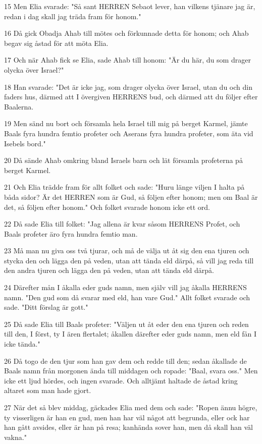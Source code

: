 \par 15 Men Elia svarade: "Så sant HERREN Sebaot lever, han vilkens tjänare jag är, redan i dag skall jag träda fram för honom."
\par 16 Då gick Obadja Ahab till mötes och förkunnade detta för honom; och Ahab begav sig åstad för att möta Elia.
\par 17 Och när Ahab fick se Elia, sade Ahab till honom: "Är du här, du som drager olycka över Israel?"
\par 18 Han svarade: "Det är icke jag, som drager olycka över Israel, utan du och din faders hus, därmed att I övergiven HERRENS bud, och därmed att du följer efter Baalerna.
\par 19 Men sänd nu bort och församla hela Israel till mig på berget Karmel, jämte Baals fyra hundra femtio profeter och Aserans fyra hundra profeter, som äta vid Isebels bord."
\par 20 Då sände Ahab omkring bland Israels barn och lät församla profeterna på berget Karmel.
\par 21 Och Elia trädde fram för allt folket och sade: "Huru länge viljen I halta på båda sidor? Är det HERREN som är Gud, så följen efter honom; men om Baal är det, så följen efter honom." Och folket svarade honom icke ett ord.
\par 22 Då sade Elia till folket: "Jag allena är kvar såsom HERRENS Profet, och Baals profeter äro fyra hundra femtio man.
\par 23 Må man nu giva oss två tjurar, och må de välja ut åt sig den ena tjuren och stycka den och lägga den på veden, utan att tända eld därpå, så vill jag reda till den andra tjuren och lägga den på veden, utan att tända eld därpå.
\par 24 Därefter mån I åkalla eder guds namn, men själv vill jag åkalla HERRENS namn. "Den gud som då svarar med eld, han vare Gud." Allt folket svarade och sade. "Ditt förslag är gott."
\par 25 Då sade Elia till Baals profeter: "Väljen ut åt eder den ena tjuren och reden till den, I först, ty I ären flertalet; åkallen därefter eder guds namn, men eld fån I icke tända."
\par 26 Då togo de den tjur som han gav dem och redde till den; sedan åkallade de Baals namn från morgonen ända till middagen och ropade: "Baal, svara oss." Men icke ett ljud hördes, och ingen svarade. Och alltjämt haltade de åstad kring altaret som man hade gjort.
\par 27 När det så blev middag, gäckades Elia med dem och sade: "Ropen ännu högre, ty visserligen är han en gud, men han har väl något att begrunda, eller ock har han gått avsides, eller är han på resa; kanhända sover han, men då skall han väl vakna."
